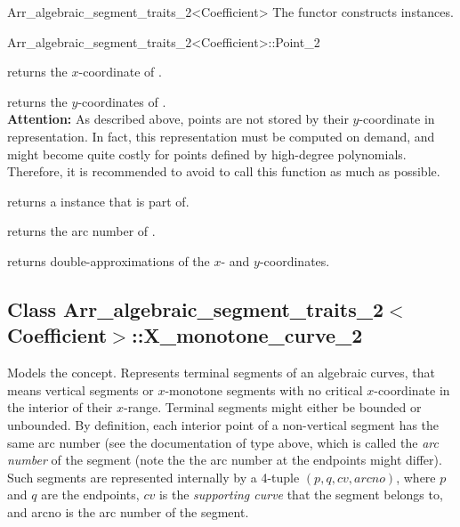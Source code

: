 \begin{ccRefClass}{Arr_algebraic_segment_traits_2<Coefficient>}
The functor  constructs  instances.

\begin{ccClass}{Arr_algebraic_segment_traits_2<Coefficient>::Point_2}


  {returns the $x$-coordinate of \ccVar.}

  {returns the $y$-coordinates of \ccVar. \\
   \textbf{Attention:} As described above, points are not stored
   by their $y$-coordinate in  representation. In fact,
   this representation must be computed on demand, and might become quite
   costly for points defined by high-degree polynomials. Therefore, it is
   recommended to avoid to call this function as much as possible.}

  {returns a  instance that \ccVar is part of.}

  {returns the arc number of \ccVar.}

  {returns double-approximations of the $x$- and $y$-coordinates.}

\end{ccClass}


\subsection*{Class 
Arr\_algebraic\_segment\_traits\_2$<$Coefficient$>$::X\_monotone\_curve\_2}

Models the  concept.
Represents terminal segments of an algebraic curves,
that means vertical segments or $x$-monotone segments with no critical
$x$-coordinate in the interior of their $x$-range.
Terminal segments might either be bounded or unbounded.
By definition, each interior point of 
a non-vertical segment has the same arc number (see the documentation of 
type  above, which is called the \emph{arc number} of the segment
(note the the arc number at the endpoints might differ).
Such segments are represented internally by a 4-tuple $(p,q,cv,arcno)$,
where $p$ and $q$ are the endpoints, $cv$ is the \emph{supporting curve}
that the segment belongs to, and arcno is the arc number of the segment.


\end{ccRefClass}
